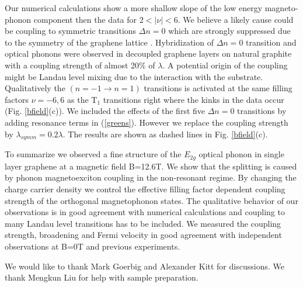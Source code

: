 \documentclass[prl,aps,superscriptaddress,showpacs,reprint]{revtex4-1}
\begin{document}
Our numerical calculations show a more shallow slope of the low energy magneto-phonon component then the data for $2 < \left|\nu\right| < 6$. We believe a likely cause could be coupling to symmetric transitions $\Delta n = 0$ which are strongly suppressed due to the symmetry of the graphene lattice \cite{PhysRevB.84.235138}. Hybridization of $\Delta n =0$ transition and optical phonons were observed in decoupled graphene layers on natural graphite \cite{faugeras2011magneto,kuhne2012polarization} with a coupling strength of almost 20\% of $\lambda$. A potential origin of the coupling might be Landau level mixing due to the interaction with the substrate. Qualitatively the $(n=-1 \rightarrow n=1)$ transitions is activated at the same filling factors $\nu=-6,6$ as the T$_1$ transitions right where the kinks in the data occur (Fig. \ref{bfield}(c)). We included the effects of the first five $\Delta n = 0$ transitions by adding resonance terms in (\ref{greens}). However we replace the coupling strength by $\lambda_{symm} =0.2\lambda$. The results are shown as dashed lines in Fig. \ref{bfield}(c).

To summarize we observed a fine structure of the $E_{2g}$ optical phonon in single layer graphene at a magnetic field B=12.6T. We show that the splitting is caused by phonon magnetoexciton coupling in the non-resonant regime. By changing the charge carrier density we control the effective filling factor dependent coupling strength of the orthogonal magnetophonon states. The qualitative behavior of our observations is in good agreement with numerical calculations and coupling to many Landau level transitions has to be included. We measured the coupling strength, broadening and Fermi velocity in good agreement with independent observations at B=0T and previous experiments.
\\

\begin{acknowledgments}
We would like to thank Mark Goerbig and Alexander Kitt for discussions. We thank Mengkun Liu for help with sample preparation.
\end{acknowledgments}








\end{document}
